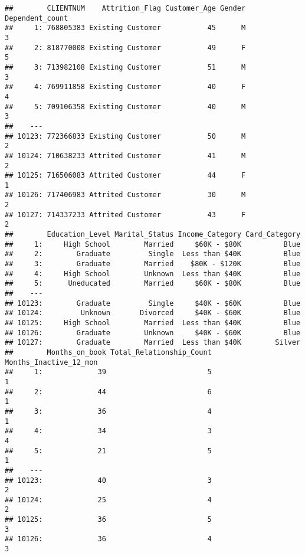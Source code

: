 \documentclass[]{article}
\begin{document}
\begin{verbatim}
##        CLIENTNUM    Attrition_Flag Customer_Age Gender Dependent_count
##     1: 768805383 Existing Customer           45      M               3
##     2: 818770008 Existing Customer           49      F               5
##     3: 713982108 Existing Customer           51      M               3
##     4: 769911858 Existing Customer           40      F               4
##     5: 709106358 Existing Customer           40      M               3
##    ---                                                                
## 10123: 772366833 Existing Customer           50      M               2
## 10124: 710638233 Attrited Customer           41      M               2
## 10125: 716506083 Attrited Customer           44      F               1
## 10126: 717406983 Attrited Customer           30      M               2
## 10127: 714337233 Attrited Customer           43      F               2
##        Education_Level Marital_Status Income_Category Card_Category
##     1:     High School        Married     $60K - $80K          Blue
##     2:        Graduate         Single  Less than $40K          Blue
##     3:        Graduate        Married    $80K - $120K          Blue
##     4:     High School        Unknown  Less than $40K          Blue
##     5:      Uneducated        Married     $60K - $80K          Blue
##    ---                                                             
## 10123:        Graduate         Single     $40K - $60K          Blue
## 10124:         Unknown       Divorced     $40K - $60K          Blue
## 10125:     High School        Married  Less than $40K          Blue
## 10126:        Graduate        Unknown     $40K - $60K          Blue
## 10127:        Graduate        Married  Less than $40K        Silver
##        Months_on_book Total_Relationship_Count Months_Inactive_12_mon
##     1:             39                        5                      1
##     2:             44                        6                      1
##     3:             36                        4                      1
##     4:             34                        3                      4
##     5:             21                        5                      1
##    ---                                                               
## 10123:             40                        3                      2
## 10124:             25                        4                      2
## 10125:             36                        5                      3
## 10126:             36                        4                      3

\end{verbatim}
\end{document}
